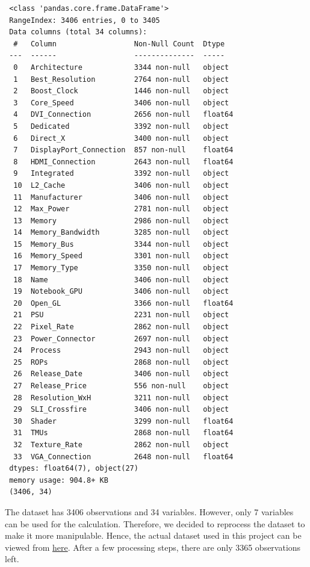 \documentclass[a4paper]{article}
\begin{document}
\begin{lstlisting}
 <class 'pandas.core.frame.DataFrame'>
 RangeIndex: 3406 entries, 0 to 3405
 Data columns (total 34 columns):
  #   Column                  Non-Null Count  Dtype  
 ---  ------                  --------------  -----  
  0   Architecture            3344 non-null   object 
  1   Best_Resolution         2764 non-null   object 
  2   Boost_Clock             1446 non-null   object 
  3   Core_Speed              3406 non-null   object 
  4   DVI_Connection          2656 non-null   float64
  5   Dedicated               3392 non-null   object 
  6   Direct_X                3400 non-null   object 
  7   DisplayPort_Connection  857 non-null    float64
  8   HDMI_Connection         2643 non-null   float64
  9   Integrated              3392 non-null   object 
  10  L2_Cache                3406 non-null   object 
  11  Manufacturer            3406 non-null   object 
  12  Max_Power               2781 non-null   object 
  13  Memory                  2986 non-null   object 
  14  Memory_Bandwidth        3285 non-null   object 
  15  Memory_Bus              3344 non-null   object 
  16  Memory_Speed            3301 non-null   object 
  17  Memory_Type             3350 non-null   object 
  18  Name                    3406 non-null   object 
  19  Notebook_GPU            3406 non-null   object 
  20  Open_GL                 3366 non-null   float64
  21  PSU                     2231 non-null   object 
  22  Pixel_Rate              2862 non-null   object 
  23  Power_Connector         2697 non-null   object 
  24  Process                 2943 non-null   object 
  25  ROPs                    2868 non-null   object 
  26  Release_Date            3406 non-null   object 
  27  Release_Price           556 non-null    object 
  28  Resolution_WxH          3211 non-null   object 
  29  SLI_Crossfire           3406 non-null   object 
  30  Shader                  3299 non-null   float64
  31  TMUs                    2868 non-null   float64
  32  Texture_Rate            2862 non-null   object 
  33  VGA_Connection          2648 non-null   float64
 dtypes: float64(7), object(27)
 memory usage: 904.8+ KB
 (3406, 34)
\end{lstlisting}
The dataset has 3406 observations and 34 variables. However, only 7 variables can be used for the calculation. Therefore, we decided to reprocess the dataset to make it more manipulable. Hence, the actual dataset used in this project can be viewed from \href{https://colab.research.google.com/drive/1ixVXEsUy2YtcCrayuPR6mmMf80pT92nh}{here}. After a few processing steps, there are only 3365 observations left.
\end{document}
